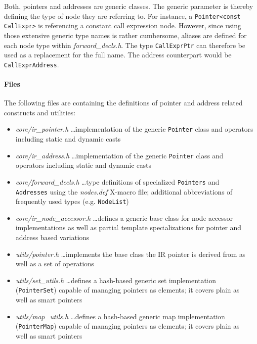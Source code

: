Both, pointers and addresses are generic classes. The generic parameter is
thereby defining the type of node they are referring to. For instance, a
\lstinline|Pointer<const CallExpr>| is referencing a constant call expression
node. However, since using those extensive generic type names is rather
cumbersome, aliases are defined for each node type within
\textit{forward\_decls.h}. The type \texttt{CallExprPtr} can therefore be used
as a replacement for the full name. The address counterpart would be
\texttt{CallExprAddress}.


\paragraph{Files}
The following files are containing the definitions of pointer and address
related constructs and utilities:
\begin{itemize}
  \item \textit{core/ir\_pointer.h} \ldots implementation of the generic
  \texttt{Pointer} class and operators including static and dynamic casts
  \item \textit{core/ir\_address.h} \ldots implementation of the generic
  \texttt{Pointer} class and operators including static and dynamic casts
  \item \textit{core/forward\_decls.h} \ldots type definitions of specialized
  \texttt{Pointers} and \texttt{Addresses} using the \textit{nodes.def} X-macro
  file; additional abbreviations of frequently used types (e.g.
  \texttt{NodeList})
  \item \textit{core/ir\_node\_accessor.h} \ldots defines a generic base class
  for node accessor implementations as well as partial template specializations
  for pointer and address based variations
  \item \textit{utils/pointer.h} \ldots implements the base class the IR
  pointer is derived from as well as a set of operations
  \item \textit{utils/set\_utils.h} \ldots defines a hash-based generic set
  implementation (\texttt{PointerSet}) capable of managing pointers as elements;
  it covers plain as well as smart pointers
  \item \textit{utils/map\_utils.h} \ldots defines a hash-based generic map
  implementation (\texttt{PointerMap}) capable of managing pointers as elements;
  it covers plain as well as smart pointers
\end{itemize}


